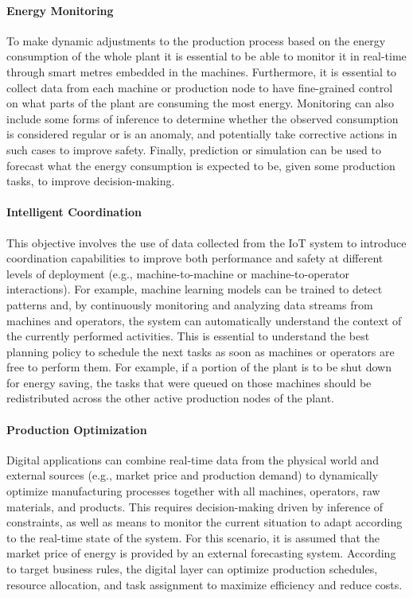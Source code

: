 \paragraph{Energy Monitoring}
To make dynamic adjustments to the production process based on the energy consumption of the whole plant it is essential to be able to monitor it in real-time through smart metres embedded in the machines.
Furthermore, it is essential to collect data from each machine or production node to have fine-grained control on what parts of the plant are consuming the most energy.
%
Monitoring can also include some forms of inference to determine whether the observed consumption is considered regular or is an anomaly, and potentially take corrective actions in such cases to improve safety.
%
Finally, prediction or simulation can be used to forecast what the energy consumption is expected to be, given some production tasks, to improve decision-making.

\paragraph{Intelligent Coordination}
This objective involves the use of data collected from the IoT system to introduce coordination capabilities to improve both performance and safety at different levels of deployment (e.g., machine-to-machine or machine-to-operator interactions).
%
For example, machine learning models can be trained to detect patterns and, by continuously monitoring and analyzing data streams from machines and operators, the system can automatically understand the context of the currently performed activities.
%
This is essential to understand the best planning policy to schedule the next tasks as soon as machines or operators are free to perform them.
%
For example, if a portion of the plant is to be shut down for energy saving, the tasks that were queued on those machines should be redistributed across the other active production nodes of the plant.

\paragraph{Production Optimization}
Digital applications can combine real-time data from the physical world and external sources (e.g., market price and production demand) to dynamically optimize manufacturing processes together with all machines, operators, raw materials, and products.
%
This requires decision-making driven by inference of constraints, as well as means to monitor the current situation to adapt according to the real-time state of the system.
%
For this scenario, it is assumed that the market price of energy is provided by an external forecasting system. According to target business rules, the digital layer can optimize production schedules, resource allocation, and task assignment to maximize efficiency and reduce costs.

